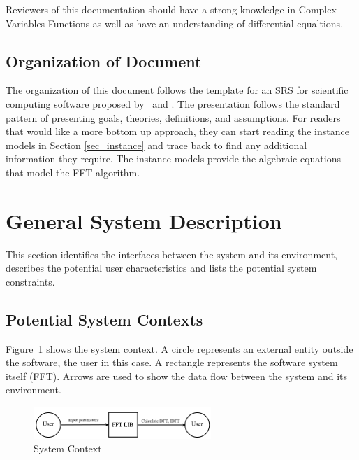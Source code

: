 \documentclass[12pt]{article}
\newcommand{\famname}{FFT} %
\begin{document}
Reviewers of this documentation should have a strong knowledge in Complex
Variables Functions as well as have an understanding of differential
equaltions.  

\subsection{Organization of Document}
The organization of this document follows the template for an SRS for scientific
computing software proposed by~\cite{Koothoor2013}  and \cite{SmithAndLai2005}.
The presentation follows the standard pattern of presenting goals, theories,
definitions, and assumptions.  For readers that would like a more bottom up
approach, they can start reading the instance models in Section
\ref{sec_instance} and trace back to find any additional information they
require.  The instance models provide the algebraic equations that model the FFT algorithm.


\section{General System Description}

This section identifies the interfaces between the system and its environment,
describes the potential user characteristics and lists the potential system
constraints.

\subsection{Potential System Contexts}

Figure~\ref{Fig_SystemContext} shows the system context.  A circle represents an
external entity outside the software, the user in this case.  A rectangle
represents the software system itself (\famname{}).  Arrows are used to show the data
flow between the system and its environment.


\begin{figure}[h!]
\begin{center}
 \includegraphics[width=0.6\textwidth]{SystemContextFigure}
\caption{System Context}
\label{Fig_SystemContext} 
\end{center}
\end{figure}
\end{document}

